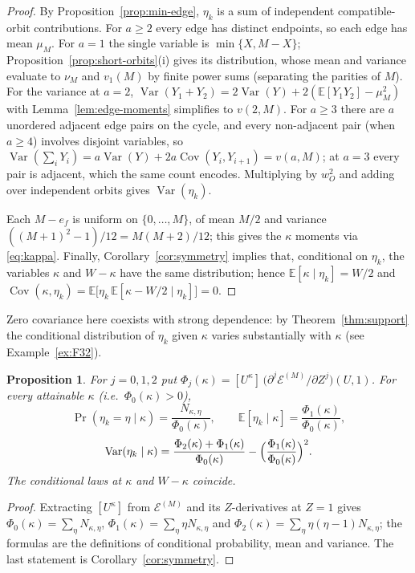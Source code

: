 \documentclass[11pt,a4paper]{article}
\newcommand{\Epoly}{\mathscr E}
\numberwithin{equation}{section}
\theoremstyle{plain}
\newtheorem{proposition}[theorem]{Proposition}
\theoremstyle{definition}
\theoremstyle{remark}
\begin{document}
\begin{proof}
By Proposition~\ref{prop:min-edge}, $\eta_k$ is a sum of independent
compatible-orbit contributions.  For $a\geq2$ every edge has distinct
endpoints, so each edge has mean $\mu_M$.  For $a=1$ the single variable is
$\min\{X,M-X\}$; Proposition~\ref{prop:short-orbits}(i) gives its distribution,
whose mean and variance evaluate to $\nu_M$ and $v_1(M)$ by finite power sums
(separating the parities of $M$).  For the variance at $a=2$,
$\operatorname{Var}(Y_1+Y_2)=2\operatorname{Var}(Y)
 +2(\mathbb{E}[Y_1Y_2]-\mu_M^2)$ with
Lemma~\ref{lem:edge-moments} simplifies to $v(2,M)$.  For $a\geq3$ there are
$a$ unordered adjacent edge pairs on the cycle, and every non-adjacent pair
(when $a\geq4$) involves disjoint variables, so
$\operatorname{Var}(\sum_iY_i)=a\operatorname{Var}(Y)
 +2a\operatorname{Cov}(Y_i,Y_{i+1})=v(a,M)$; at $a=3$ every pair is adjacent,
which the same count encodes.  Multiplying by $w_O^2$ and adding over
independent orbits gives $\operatorname{Var}(\eta_k)$.

Each $M-e_f$ is uniform on $\{0,\ldots,M\}$, of mean $M/2$ and variance
$((M+1)^2-1)/12=M(M+2)/12$; this gives the $\kappa$ moments via
\eqref{eq:kappa}.  Finally, Corollary~\ref{cor:symmetry} implies that,
conditional on $\eta_k$, the variables $\kappa$ and $W-\kappa$ have the same
distribution; hence $\mathbb{E}[\kappa\mid\eta_k]=W/2$ and
$\operatorname{Cov}(\kappa,\eta_k)
 =\mathbb{E}\bigl[\eta_k\,\mathbb{E}[\kappa-W/2\mid\eta_k]\bigr]=0$.
\end{proof}

Zero covariance here coexists with strong dependence: by
Theorem~\ref{thm:support} the conditional distribution of $\eta_k$ given
$\kappa$ varies substantially with $\kappa$ (see Example~\ref{ex:F32}).

\begin{proposition}\label{prop:conditional}
For $j=0,1,2$ put
$\Phi_j(\kappa)=[U^\kappa]\,
 \bigl(\partial^j\Epoly^{(M)}/\partial Z^j\bigr)(U,1)$.
For every attainable $\kappa$ (i.e.\ $\Phi_0(\kappa)>0$),
\[
\Pr(\eta_k=\eta\mid\kappa)=\frac{N_{\kappa,\eta}}{\Phi_0(\kappa)},\qquad
\mathbb{E}[\eta_k\mid\kappa]=\frac{\Phi_1(\kappa)}{\Phi_0(\kappa)},
\]
\[
\operatorname{Var}(\eta_k\mid\kappa)
 =\frac{\Phi_2(\kappa)+\Phi_1(\kappa)}{\Phi_0(\kappa)}
  -\Bigl(\frac{\Phi_1(\kappa)}{\Phi_0(\kappa)}\Bigr)^2.
\]
The conditional laws at $\kappa$ and $W-\kappa$ coincide.
\end{proposition}

\begin{proof}
Extracting $[U^\kappa]$ from $\Epoly^{(M)}$ and its $Z$-derivatives at $Z=1$
gives $\Phi_0(\kappa)=\sum_\eta N_{\kappa,\eta}$,
$\Phi_1(\kappa)=\sum_\eta\eta N_{\kappa,\eta}$ and
$\Phi_2(\kappa)=\sum_\eta\eta(\eta-1)N_{\kappa,\eta}$; the formulas are the
definitions of conditional probability, mean and variance.  The last statement
is Corollary~\ref{cor:symmetry}.
\end{proof}
\end{document}
